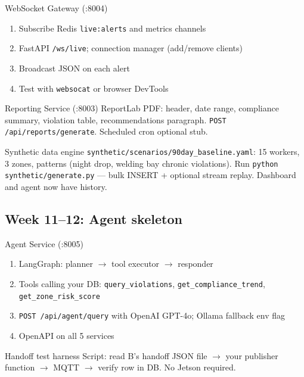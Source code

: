 \documentclass[12pt,a4paper]{report}
\begin{document}
\begin{stepbox}{WebSocket Gateway (:8004)}
\begin{enumerate}
    \item Subscribe Redis \texttt{live:alerts} and metrics channels
    \item FastAPI \texttt{/ws/live}; connection manager (add/remove clients)
    \item Broadcast JSON on each alert
    \item Test with \texttt{websocat} or browser DevTools
\end{enumerate}
\end{stepbox}

\begin{stepbox}{Reporting Service (:8003)}
ReportLab PDF: header, date range, compliance summary, violation table, recommendations paragraph. \texttt{POST /api/reports/generate}. Scheduled cron optional stub.
\end{stepbox}

\begin{stepbox}{Synthetic data engine}
\texttt{synthetic/scenarios/90day\_baseline.yaml}: 15 workers, 3 zones, patterns (night drop, welding bay chronic violations). Run \texttt{python synthetic/generate.py} --- bulk INSERT + optional stream replay. Dashboard and agent now have history.
\end{stepbox}

\subsection{Week 11--12: Agent skeleton}

\begin{stepbox}{Agent Service (:8005)}
\begin{enumerate}
    \item LangGraph: planner $\rightarrow$ tool executor $\rightarrow$ responder
    \item Tools calling your DB: \texttt{query\_violations}, \texttt{get\_compliance\_trend}, \texttt{get\_zone\_risk\_score}
    \item \texttt{POST /api/agent/query} with OpenAI GPT-4o; Ollama fallback env flag
    \item OpenAPI on all 5 services
\end{enumerate}
\end{stepbox}

\begin{stepbox}{Handoff test harness}
Script: read B's handoff JSON file $\rightarrow$ your publisher function $\rightarrow$ MQTT $\rightarrow$ verify row in DB. No Jetson required.
\end{stepbox}
\end{document}

